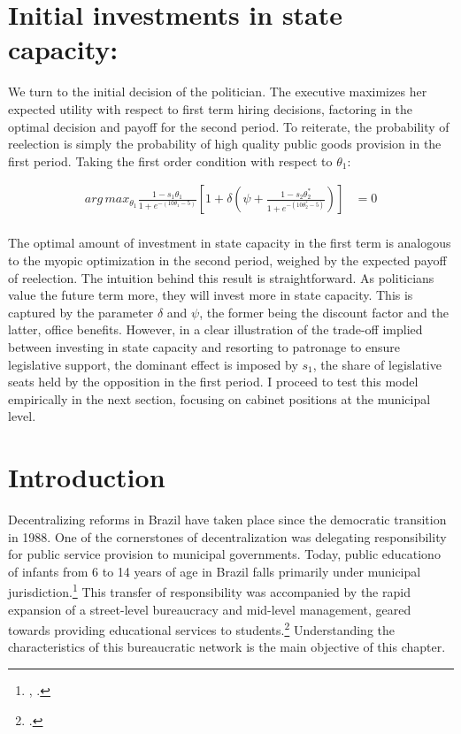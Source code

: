 \documentclass[12pt,]{book}
\let\rmarkdownfootnote\footnote%
\def\footnote{\protect\rmarkdownfootnote}
\begin{document}
\hypertarget{initial-investments-in-state-capacity}{%
\section{Initial investments in state capacity:}\label{initial-investments-in-state-capacity}}

We turn to the initial decision of the politician. The executive maximizes her expected utility with respect to first term hiring decisions, factoring in the optimal decision and payoff for the second period. To reiterate, the probability of reelection is simply the probability of high quality public goods provision in the first period. Taking the first order condition with respect to \(\theta_1\):

\begin{align*}
arg\,max_{\theta_1} \frac{1-s_1\theta_1}{1+e^{-(10\theta_1-5)}}\left[1+\delta\left(\psi + \frac{1-s_2\theta_2^*}{1+e^{-(10\theta_2^*-5)}}\right)\right] &= 0 \\
\end{align*}

The optimal amount of investment in state capacity in the first term is analogous to the myopic optimization in the second period, weighed by the expected payoff of reelection. The intuition behind this result is straightforward. As politicians value the future term more, they will invest more in state capacity. This is captured by the parameter \(\delta\) and \(\psi\), the former being the discount factor and the latter, office benefits. However, in a clear illustration of the trade-off implied between investing in state capacity and resorting to patronage to ensure legislative support, the dominant effect is imposed by \(s_1\), the share of legislative seats held by the opposition in the first period. I proceed to test this model empirically in the next section, focusing on cabinet positions at the municipal level.

\hypertarget{introduction-1}{%
\section{Introduction}\label{introduction-1}}

Decentralizing reforms in Brazil have taken place since the democratic transition in 1988. One of the cornerstones of decentralization was delegating responsibility for public service provision to municipal governments. Today, public educationo of infants from 6 to 14 years of age in Brazil falls primarily under municipal jurisdiction.\footnote{\citet{falleti_decentralization_2010}, \citet{eaton_politics_2004}.} This transfer of responsibility was accompanied by the rapid expansion of a street-level bureaucracy and mid-level management, geared towards providing educational services to students.\footnote{\citet{lipsky_street-level_1983}.} Understanding the characteristics of this bureaucratic network is the main objective of this chapter.
\end{document}
